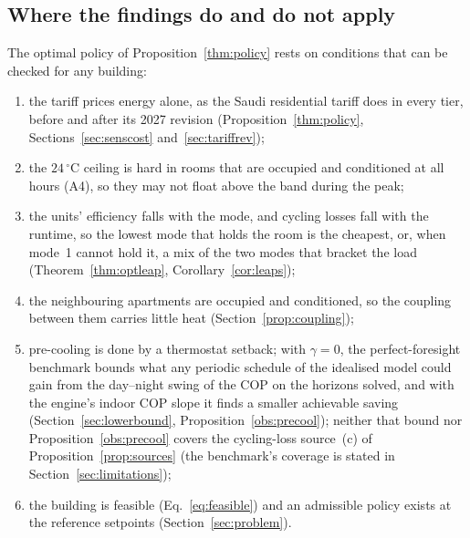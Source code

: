\documentclass[10pt,a4paper,twocolumn]{article}
\theoremstyle{definition}
\begin{document}
\subsection{Where the findings do and do not apply}\label{sec:scope}
The optimal policy of Proposition~\ref{thm:policy} rests on conditions that can be checked for any building:
\begin{enumerate}[label=(\roman*),leftmargin=1.8em,itemsep=1pt,topsep=2pt]
\item the tariff prices energy alone, as the Saudi residential tariff does in every tier, before and after its 2027 revision (Proposition~\ref{thm:policy}, Sections~\ref{sec:senscost} and~\ref{sec:tariffrev});
\item the $24\,^{\circ}$C ceiling is hard in rooms that are occupied and conditioned at all hours (A4), so they may not float above the band during the peak;
\item the units' efficiency falls with the mode, and cycling losses fall with the runtime, so the lowest mode that holds the room is the cheapest, or, when mode~1 cannot hold it, a mix of the two modes that bracket the load (Theorem~\ref{thm:optleap}, Corollary~\ref{cor:leaps});
\item the neighbouring apartments are occupied and conditioned, so the coupling between them carries little heat (Section~\ref{prop:coupling});
\item pre-cooling is done by a thermostat setback; with $\gamma=0$, the perfect-foresight benchmark bounds what any periodic schedule of the idealised model could gain from the day--night swing of the COP on the horizons solved, and with the engine's indoor COP slope it finds a smaller achievable saving (Section~\ref{sec:lowerbound}, Proposition~\ref{obs:precool}); neither that bound nor Proposition~\ref{obs:precool} covers the cycling-loss source~(c) of Proposition~\ref{prop:sources} (the benchmark's coverage is stated in Section~\ref{sec:limitations});
\item the building is feasible (Eq.~\eqref{eq:feasible}) and an admissible policy exists at the reference setpoints (Section~\ref{sec:problem}).
\end{enumerate}
\end{document}
